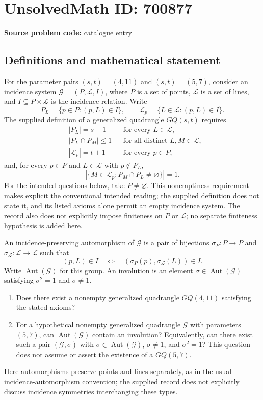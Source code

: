 \documentclass[11pt]{article}
\begin{document}
\section*{UnsolvedMath ID: 700877}
\textbf{Source problem code:} catalogue entry
\subsection{Definitions and mathematical statement}
For the parameter pairs \((s,t)=(4,11)\) and \((s,t)=(5,7)\), consider an incidence system \(\mathcal G=(P,\mathcal L,I)\), where \(P\) is a set of points, \(\mathcal L\) is a set of lines, and \(I\subseteq P\times\mathcal L\) is the incidence relation. Write
\[
P_L=\{p\in P:(p,L)\in I\},\qquad
\mathcal L_p=\{L\in\mathcal L:(p,L)\in I\}.
\]
The supplied definition of a generalized quadrangle \(GQ(s,t)\) requires
\[
\begin{aligned}
&|P_L|=s+1 &&\text{for every }L\in\mathcal L,\\
&|P_L\cap P_M|\leq 1 &&\text{for all distinct }L,M\in\mathcal L,\\
&|\mathcal L_p|=t+1 &&\text{for every }p\in P,
\end{aligned}
\]
and, for every \(p\in P\) and \(L\in\mathcal L\) with \(p\notin P_L\),
\[
\left|\{M\in\mathcal L_p:P_M\cap P_L\neq\varnothing\}\right|=1.
\]
For the intended questions below, take \(P\neq\varnothing\). This nonemptiness requirement makes explicit the conventional intended reading; the supplied definition does not state it, and its listed axioms alone permit an empty incidence system. The record also does not explicitly impose finiteness on \(P\) or \(\mathcal L\); no separate finiteness hypothesis is added here.

An incidence-preserving automorphism of \(\mathcal G\) is a pair of bijections \(\sigma_P:P\to P\) and \(\sigma_{\mathcal L}:\mathcal L\to\mathcal L\) such that
\[
(p,L)\in I\quad\Longleftrightarrow\quad
(\sigma_P(p),\sigma_{\mathcal L}(L))\in I.
\]
Write \(\operatorname{Aut}(\mathcal G)\) for this group. An involution is an element \(\sigma\in\operatorname{Aut}(\mathcal G)\) satisfying \(\sigma^2=1\) and \(\sigma\neq 1\).

\begin{enumerate}
\item[(a)] Does there exist a nonempty generalized quadrangle \(GQ(4,11)\) satisfying the stated axioms?
\item[(b)] For a hypothetical nonempty generalized quadrangle \(\mathcal G\) with parameters \((5,7)\), can \(\operatorname{Aut}(\mathcal G)\) contain an involution? Equivalently, can there exist such a pair \((\mathcal G,\sigma)\) with \(\sigma\in\operatorname{Aut}(\mathcal G)\), \(\sigma\neq 1\), and \(\sigma^2=1\)? This question does not assume or assert the existence of a \(GQ(5,7)\).
\end{enumerate}
Here automorphisms preserve points and lines separately, as in the usual incidence-automorphism convention; the supplied record does not explicitly discuss incidence symmetries interchanging these types.
\end{document}
